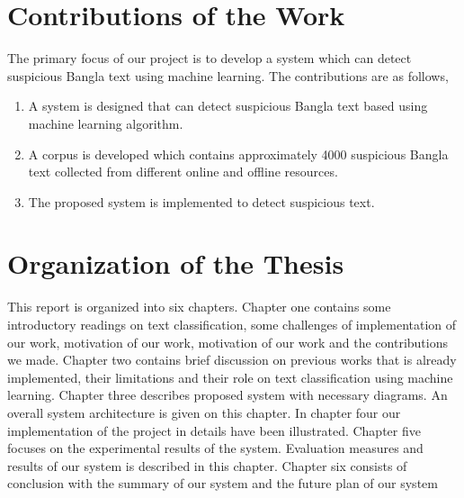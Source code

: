 \section{Contributions of the Work}
The primary focus of our project is to develop a system which can detect suspicious Bangla text using machine learning. The contributions are as follows,
\begin{enumerate}
    \item A system is designed that can detect suspicious Bangla text based using machine learning algorithm.
    
    \item A corpus is developed which contains approximately 4000 suspicious Bangla text collected from different online and offline resources.
    
    \item The proposed system is implemented to detect suspicious text.
\end{enumerate}

\section{Organization of the Thesis}
This report is organized into six chapters. Chapter one contains some introductory readings
on text classification, some challenges of implementation of our work, motivation of our work, motivation of our work and the contributions we made. Chapter two contains brief discussion on previous works that is already implemented, their limitations and their role on text classification using machine learning. Chapter three describes proposed system with necessary diagrams. An overall system architecture is given on this chapter. In chapter four our implementation of the project in details have been illustrated. Chapter five focuses on the experimental results of the system. Evaluation measures and results of our system is described in this chapter. Chapter six consists of conclusion with the summary of our system and
the future plan of our system
\clearpage
